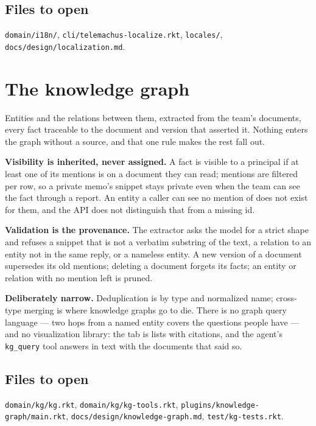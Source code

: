 \documentclass[11pt,a4paper]{report}
\gdef\currentchapterart{art/telemachus-head.png}
\newcommand{\chapterart}[1]{\gdef\currentchapterart{#1}}
\newcommand{\chapterart}[1]{}
\begin{document}
\section{Files to open}

\texttt{domain/i18n/}, \texttt{cli/telemachus-localize.rkt}, \texttt{locales/}, \texttt{docs/design/localization.md}.

\chapterart{art/ch-11-kg.png}
\chapter{The knowledge graph}

Entities and the relations between them, extracted from the team's documents, every fact traceable to the document and version that asserted it. Nothing enters the graph without a source, and that one rule makes the rest fall out.

\textbf{Visibility is inherited, never assigned.} A fact is visible to a principal if at least one of its mentions is on a document they can read; mentions are filtered per row, so a private memo's snippet stays private even when the team can see the fact through a report. An entity a caller can see no mention of does not exist for them, and the API does not distinguish that from a missing id.

\textbf{Validation is the provenance.} The extractor asks the model for a strict shape and refuses a snippet that is not a verbatim substring of the text, a relation to an entity not in the same reply, or a nameless entity. A new version of a document supersedes its old mentions; deleting a document forgets its facts; an entity or relation with no mention left is pruned.

\textbf{Deliberately narrow.} Deduplication is by type and normalized name; cross-type merging is where knowledge graphs go to die. There is no graph query language --- two hops from a named entity covers the questions people have --- and no visualization library: the tab is lists with citations, and the agent's \texttt{kg\_query} tool answers in text with the documents that said so.

\section{Files to open}

\texttt{domain/kg/kg.rkt}, \texttt{domain/kg/kg-tools.rkt}, \texttt{plugins/knowledge-graph/main.rkt}, \texttt{docs/design/knowledge-graph.md}, \texttt{test/kg-tests.rkt}.
\end{document}
